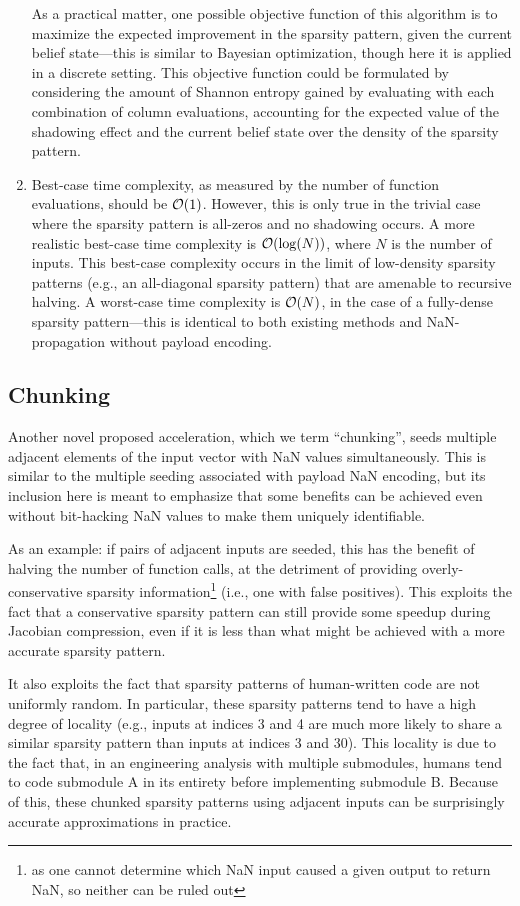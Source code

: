 \begin{enumerate}
    As a practical matter, one possible objective function of this algorithm is to maximize the expected improvement in the sparsity pattern, given the current belief state—this is similar to Bayesian optimization, though here it is applied in a discrete setting. This objective function could be formulated by considering the amount of Shannon entropy gained by evaluating with each combination of column evaluations, accounting for the expected value of the shadowing effect and the current belief state over the density of the sparsity pattern.
    \item Best-case time complexity, as measured by the number of function evaluations, should be $\mathcal{O}(1)$. However, this is only true in the trivial case where the sparsity pattern is all-zeros and no shadowing occurs. A more realistic best-case time complexity is $\mathcal{O}(\log(N))$, where $N$ is the number of inputs. This best-case complexity occurs in the limit of low-density sparsity patterns (e.g., an all-diagonal sparsity pattern) that are amenable to recursive halving. A worst-case time complexity is $\mathcal{O}(N)$, in the case of a fully-dense sparsity pattern—this is identical to both existing methods and NaN-propagation without payload encoding.
\end{enumerate}


\subsection{Chunking}

Another novel proposed acceleration, which we term ``chunking'', seeds multiple adjacent elements of the input vector with NaN values simultaneously. This is similar to the multiple seeding associated with payload NaN encoding, but its inclusion here is meant to emphasize that some benefits can be achieved even without bit-hacking NaN values to make them uniquely identifiable.

As an example: if pairs of adjacent inputs are seeded, this has the benefit of halving the number of function calls, at the detriment of providing overly-conservative sparsity information\footnote{as one cannot determine which NaN input caused a given output to return NaN, so neither can be ruled out} (i.e., one with false positives). This exploits the fact that a conservative sparsity pattern can still provide some speedup during Jacobian compression, even if it is less than what might be achieved with a more accurate sparsity pattern.

It also exploits the fact that sparsity patterns of human-written code are not uniformly random. In particular, these sparsity patterns tend to have a high degree of locality (e.g., inputs at indices 3 and 4 are much more likely to share a similar sparsity pattern than inputs at indices 3 and 30). This locality is due to the fact that, in an engineering analysis with multiple submodules, humans tend to code submodule A in its entirety before implementing submodule B. Because of this, these chunked sparsity patterns using adjacent inputs can be surprisingly accurate approximations in practice.


